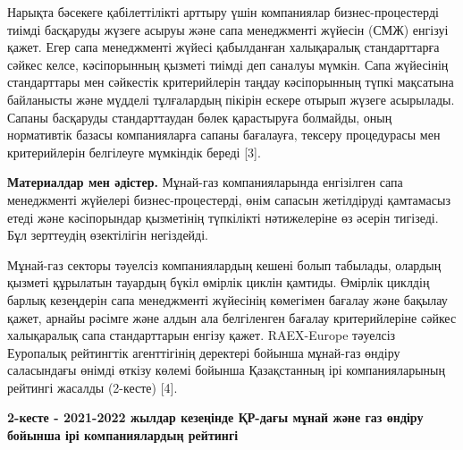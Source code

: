 Нарықта бәсекеге қабілеттілікті арттыру үшін компаниялар
бизнес-процестерді тиімді басқаруды жүзеге асыруы және сапа менеджменті
жүйесін (СМЖ) енгізуі қажет. Егер сапа менеджменті жүйесі қабылданған
халықаралық стандарттарға сәйкес келсе, кәсіпорынның қызметі тиімді деп
саналуы мүмкін. Сапа жүйесінің стандарттары мен сәйкестік критерийлерін
таңдау кәсіпорынның түпкі мақсатына байланысты және мүдделі тұлғалардың
пікірін ескере отырып жүзеге асырылады. Сапаны басқаруды стандарттаудан
бөлек қарастыруға болмайды, оның нормативтік базасы компанияларға сапаны
бағалауға, тексеру процедурасы мен критерийлерін белгілеуге мүмкіндік
береді {[}3{]}.

{\bfseries Материалдар мен әдістер.} Мұнай-газ компанияларында енгізілген
сапа менеджменті жүйелері бизнес-процестерді, өнім сапасын жетілдіруді
қамтамасыз етеді және кәсіпорындар қызметінің түпкілікті нәтижелеріне өз
әсерін тигізеді. Бұл зерттеудің өзектілігін негіздейді.

Мұнай-газ секторы тәуелсіз компаниялардың кешені болып табылады, олардың
қызметі құрылатын тауардың бүкіл өмірлік циклін қамтиды. Өмірлік циклдің
барлық кезеңдерін сапа менеджменті жүйесінің көмегімен бағалау және
бақылау қажет, арнайы рәсімге және алдын ала белгіленген бағалау
критерийлеріне сәйкес халықаралық сапа стандарттарын енгізу қажет.
RAEX-Europe тәуелсіз Еуропалық рейтингтік агенттігінің деректері бойынша
мұнай-газ өндіру саласындағы өнімді өткізу көлемі бойынша Қазақстанның
ірі компанияларының рейтингі жасалды (2-кесте) {[}4{]}.

{\bfseries 2-кесте - 2021-2022 жылдар кезеңінде ҚР-дағы мұнай және газ
өндіру бойынша ірі компаниялардың рейтингі}

